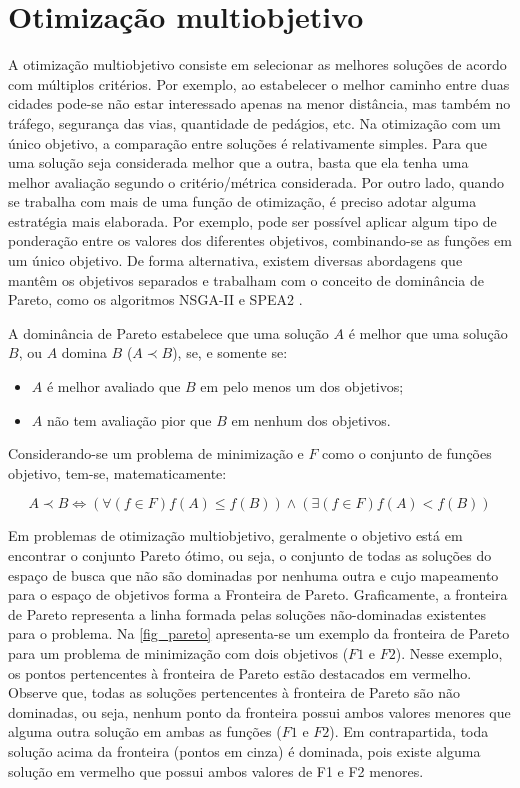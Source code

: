 \chapter[Otimização multiobjetivo]{Otimização multiobjetivo}

A otimização multiobjetivo consiste em selecionar as melhores soluções de acordo com múltiplos critérios. Por exemplo, ao estabelecer o melhor caminho entre duas cidades pode-se não estar interessado apenas na menor distância, mas também no tráfego, segurança das vias, quantidade de pedágios, etc. Na otimização com um único objetivo, a comparação entre soluções é relativamente simples. Para que uma solução seja considerada melhor que a outra, basta que ela tenha uma melhor avaliação segundo o critério/métrica considerada. Por outro lado, quando se trabalha com mais de uma função de otimização, é preciso adotar alguma estratégia mais elaborada. Por exemplo, pode ser possível aplicar algum tipo de ponderação entre os valores dos diferentes objetivos, combinando-se as funções em um único objetivo. De forma alternativa, existem diversas abordagens que mantêm os objetivos separados e trabalham com o conceito de dominância de Pareto, como os algoritmos NSGA-II \cite{Deb2002} e SPEA2 \cite{Zitzler2002}.

A dominância de Pareto estabelece que uma solução $A$ é melhor que uma solução $B$, ou $A$ domina $B$ ($A \prec B$), se, e somente se:

\begin{itemize}  
	\item $A$ é melhor avaliado que $B$ em pelo menos um dos objetivos;
	\item $A$ não tem avaliação pior que $B$ em nenhum dos objetivos.
\end{itemize}

Considerando-se um problema de minimização e $F$ como o conjunto de funções objetivo, tem-se, matematicamente:

\begin{equation}A \prec B \Leftrightarrow (\forall(f \in F) f(A) \leq f(B)) \land (\exists (f \in F) f(A) < f(B))\end{equation}

Em problemas de otimização multiobjetivo, geralmente o objetivo está em encontrar o conjunto Pareto ótimo, ou seja, o conjunto de todas as soluções do espaço de busca que não são dominadas por nenhuma outra e cujo mapeamento para o espaço de objetivos forma a Fronteira de Pareto. Graficamente, a fronteira de Pareto representa a linha formada pelas soluções não-dominadas existentes para o problema. Na \autoref{fig_pareto} apresenta-se um exemplo da fronteira de Pareto para um problema de minimização com dois objetivos ($F1$ e $F2$). Nesse exemplo, os pontos pertencentes à fronteira de Pareto estão destacados em vermelho. Observe que, todas as soluções pertencentes à fronteira de Pareto são não dominadas, ou seja, nenhum ponto da fronteira possui ambos valores menores que alguma outra solução em ambas as funções ($F1$ e $F2$). Em contrapartida, toda solução acima da fronteira (pontos em cinza) é dominada, pois existe alguma solução em vermelho que possui ambos valores de F1 e F2 menores.

